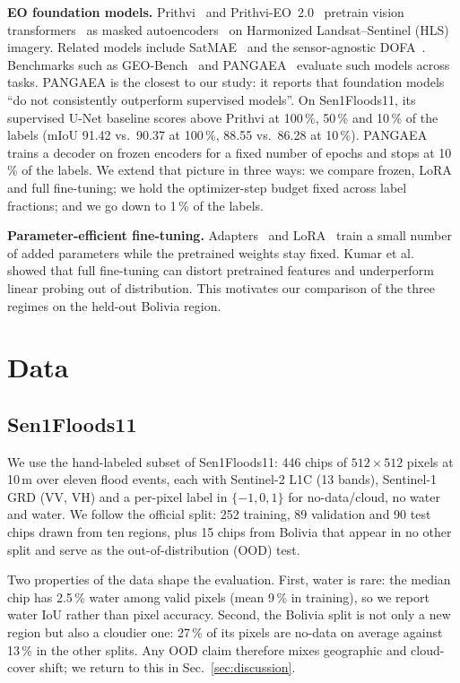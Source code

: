 \documentclass[conference]{IEEEtran}
\begin{document}
\textbf{EO foundation models.} Prithvi~\cite{jakubik2023prithvi} and Prithvi-EO~2.0~\cite{szwarcman2024prithvi} pretrain vision transformers~\cite{dosovitskiy2021vit} as masked autoencoders~\cite{he2022mae} on Harmonized Landsat--Sentinel (HLS) imagery. Related models include SatMAE~\cite{cong2022satmae} and the sensor-agnostic DOFA~\cite{xiong2024dofa}. Benchmarks such as GEO-Bench~\cite{lacoste2023geobench} and PANGAEA~\cite{marsocci2024pangaea} evaluate such models across tasks. PANGAEA is the closest to our study: it reports that foundation models ``do not consistently outperform supervised models''. On Sen1Floods11, its supervised U-Net baseline scores above Prithvi at 100\,\%, 50\,\% and 10\,\% of the labels (mIoU 91.42 vs.\ 90.37 at 100\,\%, 88.55 vs.\ 86.28 at 10\,\%). PANGAEA trains a decoder on frozen encoders for a fixed number of epochs and stops at 10\,\% of the labels. We extend that picture in three ways: we compare frozen, LoRA and full fine-tuning; we hold the optimizer-step budget fixed across label fractions; and we go down to 1\,\% of the labels.

\textbf{Parameter-efficient fine-tuning.} Adapters~\cite{houlsby2019adapters} and LoRA~\cite{hu2021lora} train a small number of added parameters while the pretrained weights stay fixed. Kumar et al.~\cite{kumar2022lpft} showed that full fine-tuning can distort pretrained features and underperform linear probing out of distribution. This motivates our comparison of the three regimes on the held-out Bolivia region.

\section{Data}
\subsection{Sen1Floods11}
We use the hand-labeled subset of Sen1Floods11: 446 chips of $512\times512$ pixels at 10\,m over eleven flood events, each with Sentinel-2 L1C (13 bands), Sentinel-1 GRD (VV, VH) and a per-pixel label in $\{-1, 0, 1\}$ for no-data/cloud, no water and water. We follow the official split: 252 training, 89 validation and 90 test chips drawn from ten regions, plus 15 chips from Bolivia that appear in no other split and serve as the out-of-distribution (OOD) test.

Two properties of the data shape the evaluation. First, water is rare: the median chip has 2.5\,\% water among valid pixels (mean 9\,\% in training), so we report water IoU rather than pixel accuracy. Second, the Bolivia split is not only a new region but also a cloudier one: 27\,\% of its pixels are no-data on average against 13\,\% in the other splits. Any OOD claim therefore mixes geographic and cloud-cover shift; we return to this in Sec.~\ref{sec:discussion}.
\end{document}
